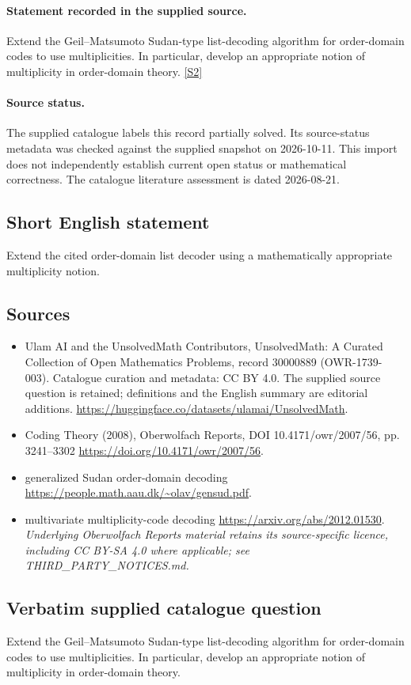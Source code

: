 \documentclass[11pt]{article}
\begin{document}
\paragraph{Statement recorded in the supplied source.}
Extend the Geil–Matsumoto Sudan-type list-decoding algorithm for order-domain codes to use multiplicities. In particular, develop an appropriate notion of multiplicity in order-domain theory. \href{https://doi.org/10.4171/owr/2007/56}{[S2]}
\paragraph{Source status.}
The supplied catalogue labels this record partially solved. Its source-status metadata was checked against the supplied snapshot on 2026-10-11. This import does not independently establish current open status or mathematical correctness. The catalogue literature assessment is dated 2026-08-21.
\subsection{Short English statement}
Extend the cited order-domain list decoder using a mathematically appropriate multiplicity notion.
\subsection{Sources}
\begin{itemize}
\item[S1] Ulam AI and the UnsolvedMath Contributors, UnsolvedMath: A Curated Collection of Open Mathematics Problems, record 30000889 (OWR-1739-003). Catalogue curation and metadata: CC BY 4.0. The supplied source question is retained; definitions and the English summary are editorial additions.
\url{https://huggingface.co/datasets/ulamai/UnsolvedMath}.
\item[S2] Coding Theory (2008), Oberwolfach Reports, DOI 10.4171/owr/2007/56, pp. 3241--3302
\url{https://doi.org/10.4171/owr/2007/56}.
\item[S3] generalized Sudan order-domain decoding
\url{https://people.math.aau.dk/~olav/gensud.pdf}.
\item[S4] multivariate multiplicity-code decoding
\url{https://arxiv.org/abs/2012.01530}.
\textit{Underlying Oberwolfach Reports material retains its source-specific licence, including CC BY-SA 4.0 where applicable; see THIRD\_PARTY\_NOTICES.md.}
\end{itemize}
\subsection{Verbatim supplied catalogue question}
Extend the Geil–Matsumoto Sudan-type list-decoding algorithm for order-domain codes to use multiplicities. In particular, develop an appropriate notion of multiplicity in order-domain theory.
\end{document}
